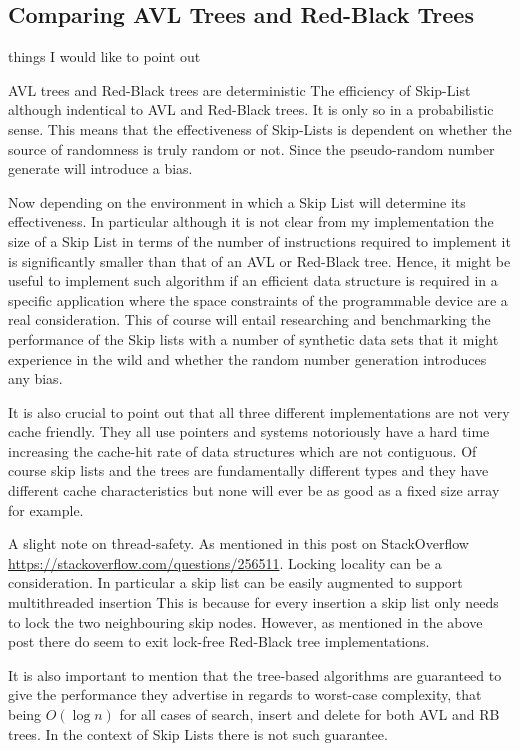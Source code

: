 \documentclass[article]{uom-coursework}
\begin{document}
\subsection{Comparing AVL Trees and Red-Black Trees}

things I would like to point out

AVL trees and Red-Black trees are deterministic
The efficiency of Skip-List although indentical
to AVL and Red-Black trees. It is only so in a probabilistic
sense. This means that the effectiveness of Skip-Lists
is dependent on whether the source of
randomness is truly random or not. Since the pseudo-random
number generate will introduce a bias.

Now depending on the environment in which a Skip List will
determine its effectiveness. In particular although
it is not clear from my implementation the size of
a Skip List in terms of the number of instructions
required to implement it is significantly smaller than
that of an AVL or Red-Black tree. Hence, it might 
be useful to implement such algorithm if
an efficient data structure is required in a specific
application where the space constraints of the programmable
device are a real consideration. This of course will entail
researching and benchmarking the performance of the
Skip lists with a number of synthetic data sets that it might
experience in the wild and whether the random number generation
introduces any bias.

It is also crucial to point out that all three different
implementations are not very cache friendly. They all use
pointers and systems notoriously have a hard time increasing the
cache-hit rate of data structures which are not contiguous. Of
course skip lists and the trees are fundamentally different
types and they have different cache characteristics but none
will ever be as good as a fixed size array for example.

A slight note on thread-safety. As mentioned in this post on
StackOverflow \url{https://stackoverflow.com/questions/256511}.
Locking locality can be a consideration. In particular a skip
list can be easily augmented to support multithreaded insertion
This is because for every insertion a skip list only needs to
lock the two neighbouring skip nodes. However, as mentioned in
the above post there do seem to exit lock-free Red-Black tree
implementations.

It is also important to mention that the tree-based algorithms
are guaranteed to give the performance they advertise in regards
to worst-case complexity, that being $O(\log n)$ for all cases
of search, insert and delete for both AVL and RB trees. In the
context of Skip Lists there is not such guarantee.
\end{document}
